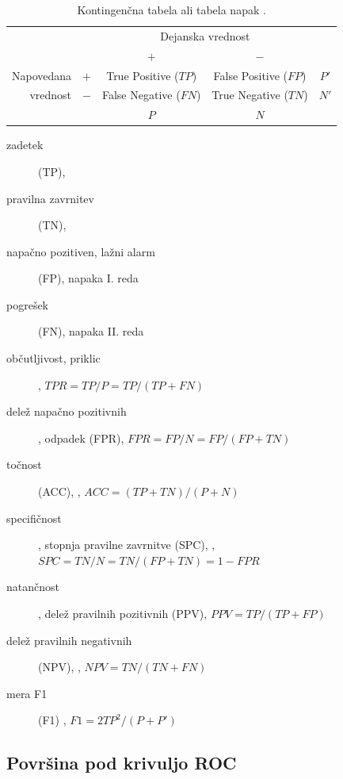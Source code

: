 \begin{table}[htbp]
\caption{Kontingenčna tabela ali tabela napak .}
\label{t-confusion-matrix}
\begin{center}
\begin{tabular}{rcccc}
& & \multicolumn{2}{c}{Dejanska vrednost} \\ 
& & $+$ & $-$ \\
\cmidrule(r){3-4}
Napovedana & $+$ & True Positive ($TP$) & False Positive ($FP$) & $P'$ \\
vrednost & $-$ & False Negative ($FN$) & True Negative ($TN$) & $N'$ \\ \cmidrule(r){3-4}
& & $P$ & $N$ \\
\end{tabular}
\end{center}
\end{table}

\begin{description}
\item[zadetek] (TP), 
\item[pravilna zavrnitev](TN), 
\item[napačno pozitiven, lažni alarm] (FP), napaka I. reda 
\item[pogrešek] (FN), napaka II. reda 
\item[občutljivost, priklic] , $TPR = {TP / P} = {TP / (TP+FN)} $
\item[delež napačno pozitivnih], odpadek (FPR),  $FPR = FP / N = FP / (FP + TN)$
\item[točnost] (ACC), , $ACC = (TP + TN) / (P + N)$
\item[specifičnost], stopnja pravilne zavrnitve (SPC), , $SPC = TN / N = TN / (FP + TN) = 1 - FPR$
\item[natančnost], delež pravilnih pozitivnih (PPV),  $PPV = TP / (TP + FP)$
\item[delež pravilnih negativnih] (NPV), , $NPV = TN / (TN + FN)$
\item[mera F1] (F1) , $F1 = 2TP^2/(P+P')$
\end{description}

\subsection{Površina pod krivuljo ROC}

